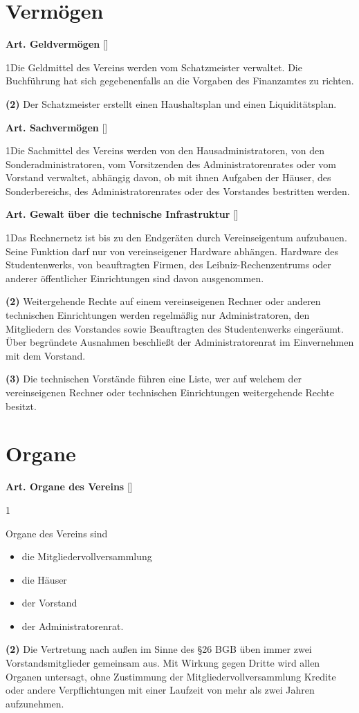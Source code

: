 \documentclass[12pt]{article}
\newcommand{\Abschnitt}[1]{\section{#1}}
\newcommand{\Satz}[2]{

\begin{samepage}
{\bf (#1)} #2
\end{samepage}
}
\newenvironment{Artikel}[2]{
\bigskip \centerline{{\bf Art. #1} [#2]}
\nopagebreak
}{
}
\begin{document}
\Abschnitt{Vermögen}

\begin{Artikel}{11}{Geldvermögen}

\Satz{1}{Die Geldmittel des Vereins werden vom Schatzmeister verwaltet.
  Die Buch\-führung hat sich gegebenenfalls an die Vorgaben des Finanzamtes zu richten.}

\Satz{2}{Der Schatzmeister erstellt einen Haushaltsplan und einen Liquiditätsplan.}

\end{Artikel}

\begin{Artikel}{12}{Sachvermögen}

\Satz{1}{Die Sachmittel des Vereins werden von den Hausadministratoren, von den Sonderadministratoren, vom Vorsitzenden des Administratorenrates oder vom Vorstand verwaltet, abhängig davon, ob mit ihnen Aufgaben der Häuser, des Sonderbereichs, des Administratorenrates oder des Vorstandes bestritten werden.}

\end{Artikel}

\begin{Artikel}{13}{Gewalt über die technische Infrastruktur}

\Satz{1}{Das Rechnernetz ist bis zu den Endgeräten durch Vereinseigentum aufzubauen.
  Seine Funktion darf nur von vereinseigener Hardware abhängen.
  Hardware des Studentenwerks, von beauftragten Firmen, des Leibniz-Rechenzentrums oder anderer öffentlicher Einrichtungen sind davon ausgenommen.}

\Satz{2}{Weitergehende Rechte auf einem vereinseigenen Rechner oder anderen technischen Einrichtungen werden regelmäßig nur Administratoren, den Mitgliedern des Vorstandes sowie Beauftragten des Studentenwerks eingeräumt.
Über begründete Ausnahmen beschließt der Administratorenrat im Einvernehmen mit dem Vorstand.}

\Satz{3}{Die technischen Vorstände führen eine Liste, wer auf welchem der vereinseigenen Rechner oder technischen Einrichtungen weitergehende Rechte besitzt.}

\end{Artikel}

\Abschnitt{Organe}

\begin{Artikel}{14}{Organe des Vereins}

\Satz{1}{Organe des Vereins sind  
\begin{itemize}
\item die Mitgliedervollversammlung
\item die Häuser
\item der Vorstand
\item der Administratorenrat.
\end{itemize}}

\Satz{2}{Die Vertretung nach außen im Sinne des \S 26 BGB üben immer zwei Vorstandsmitglieder gemeinsam aus.
  Mit Wirkung gegen Dritte wird allen Organen untersagt, ohne Zustimmung der Mitgliedervollversammlung Kredite oder andere Verpflichtungen mit einer Laufzeit von mehr als zwei Jahren aufzunehmen.}

\end{Artikel}
\end{document}
